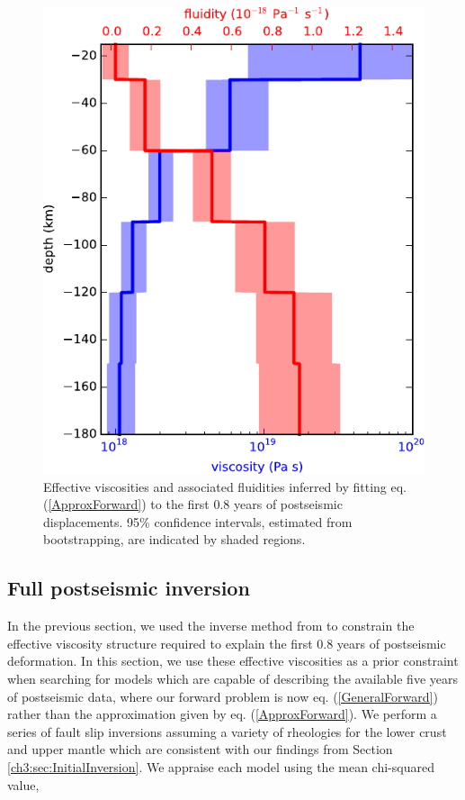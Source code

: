 \begin{figure}\label{ch3:fig:EffectiveViscosity}
\includegraphics[scale=1.0]{ch3/figures/2016jb013114-p12}
\caption{Effective viscosities and associated fluidities inferred by fitting eq. (\ref{ApproxForward}) to the first 0.8 years of postseismic displacements. 95\% confidence intervals, estimated from bootstrapping, are indicated by shaded regions.}
\end{figure} 

\subsection{Full postseismic inversion}\label{ch3:sec:FullInversion} 
In the previous section, we used the inverse method from \citet{Hines2016} to constrain the effective viscosity structure required to explain the first 0.8 years of postseismic deformation. In this section, we use these effective viscosities as a prior constraint when searching for models which are capable of describing the available five years of postseismic data, where our forward problem is now eq. (\ref{GeneralForward}) rather than the approximation given by eq. (\ref{ApproxForward}).  We perform a series of fault slip inversions assuming a variety of rheologies for the lower crust and upper mantle which are consistent with our findings from Section \ref{ch3:sec:InitialInversion}.  We appraise each model using the mean chi-squared value,

